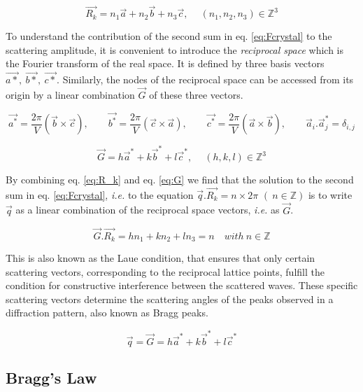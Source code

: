 \begin{equation}
    \label{eq:R_k}
    \vec{R_k}=n_1\vec{a} + n_2\vec{b} + n_3\vec{c}, \quad \ (n_1,n_2,n_3) \in \mathbb{Z}^3
\end{equation}

To understand the contribution of the second sum in eq. \ref{eq:Fcrystal} to the scattering amplitude, it is convenient to introduce the \textit{reciprocal space} which is the Fourier transform of the real space.
It is defined by three basis vectors $\vec{a*},\ \vec{b*},\ \vec{c*}$.
Similarly, the nodes of the reciprocal space can be accessed from its origin by a linear combination $\vec{G}$ of these three vectors.

\begin{equation}
    \vec{a^*}=\frac{2\pi}{V}(\vec{b}\times \vec{c}), \qquad
    \vec{b^*}=\frac{2\pi}{V}(\vec{c}\times \vec{a}), \qquad
    \vec{c^*}=\frac{2\pi}{V}(\vec{a}\times \vec{b}), \qquad
    \vec{a}_i . \vec{a}_j^* = \delta_{i,j}
\end{equation}

\begin{equation}
    \label{eq:G}
    \vec{G}=h\vec{a}^* + k\vec{b}^* + l\vec{c}^*, \quad \ (h,k,l) \in \mathbb{Z}^3
\end{equation}

By combining eq. \ref{eq:R_k} and eq. \ref{eq:G} we find that the solution to the second sum in eq. \ref{eq:Fcrystal}, \textit{i.e.} to the equation $\vec{q}.\vec{R_k} = n \times 2\pi$ $(\ n \in \mathbb{Z})$ is to write $\vec{q}$ as a linear combination of the reciprocal space vectors, \textit{i.e.} as $\vec{G}$.

\begin{equation}
    \label{eq:LaueCond}
    \vec{G} . \vec{R_k} = hn_1 + kn_2 + ln_3 = n \quad  with \ n \in \mathbb{Z}
\end{equation}

This is also known as the Laue condition, that ensures that only certain scattering vectors, corresponding to the reciprocal lattice points, fulfill the condition for constructive interference between the scattered waves.
These specific scattering vectors determine the scattering angles of the peaks observed in a diffraction pattern, also known as Bragg peaks.

\begin{equation}
    \vec{q} = \vec{G}  = h\vec{a}^* + k\vec{b}^* + l\vec{c}^*
\end{equation}

\subsection{Bragg's Law}\label{sec:BraggLaw}


